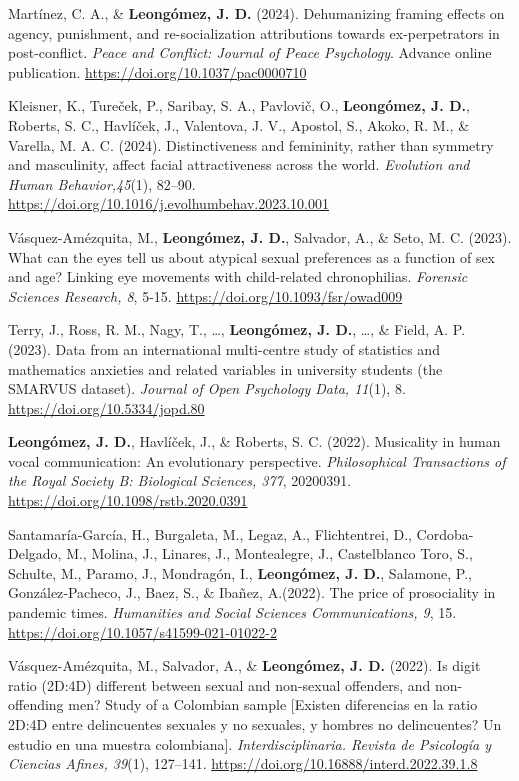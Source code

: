 \documentclass[11pt,a4paper,]{awesome-cv}
\begin{document}
Martínez, C. A., \& \textbf{Leongómez, J. D.} (2024). Dehumanizing
framing effects on agency, punishment, and re-socialization attributions
towards ex-perpetrators in post-conflict. \emph{Peace and Conflict:
Journal of Peace Psychology}. Advance online publication.
\url{https://doi.org/10.1037/pac0000710}

Kleisner, K., Tureček, P., Saribay, S. A., Pavlovič, O.,
\textbf{Leongómez, J. D.}, Roberts, S. C., Havlíček, J., Valentova, J.
V., Apostol, S., Akoko, R. M., \& Varella, M. A. C. (2024).
Distinctiveness and femininity, rather than symmetry and masculinity,
affect facial attractiveness across the world. \emph{Evolution and Human
Behavior,45}(1), 82--90.
\href{https://authors.elsevier.com/c/1hyfr3tz492kal}{https://doi.org/10.1016/j.evolhumbehav.2023.10.001}

Vásquez-Amézquita, M., \textbf{Leongómez, J. D.}, Salvador, A., \& Seto,
M. C. (2023). What can the eyes tell us about atypical sexual
preferences as a function of sex and age? Linking eye movements with
child-related chronophilias. \emph{Forensic Sciences Research, 8}, 5-15.
\url{https://doi.org/10.1093/fsr/owad009}

Terry, J., Ross, R. M., Nagy, T., \ldots, \textbf{Leongómez, J. D.},
\ldots, \& Field, A. P. (2023). Data from an international multi-centre
study of statistics and mathematics anxieties and related variables in
university students (the SMARVUS dataset). \emph{Journal of Open
Psychology Data, 11}(1), 8. \url{https://doi.org/10.5334/jopd.80}

\textbf{Leongómez, J. D.}, Havlíček, J., \& Roberts, S. C. (2022).
Musicality in human vocal communication: An evolutionary perspective.
\emph{Philosophical Transactions of the Royal Society B: Biological
Sciences, 377}, 20200391. \url{https://doi.org/10.1098/rstb.2020.0391}

Santamaría-García, H., Burgaleta, M., Legaz, A., Flichtentrei, D.,
Cordoba-Delgado, M., Molina, J., Linares, J., Montealegre, J.,
Castelblanco Toro, S., Schulte, M., Paramo, J., Mondragón, I.,
\textbf{Leongómez, J. D.}, Salamone, P., González‑Pacheco, J., Baez, S.,
\& Ibañez, A.(2022). The price of prosociality in pandemic times.
\emph{Humanities and Social Sciences Communications, 9}, 15.
\url{https://doi.org/10.1057/s41599-021-01022-2}

Vásquez-Amézquita, M., Salvador, A., \& \textbf{Leongómez, J. D.}
(2022). Is digit ratio (2D:4D) different between sexual and non-sexual
offenders, and non-offending men? Study of a Colombian sample {[}Existen
diferencias en la ratio 2D:4D entre delincuentes sexuales y no sexuales,
y hombres no delincuentes? Un estudio en una muestra colombiana{]}.
\emph{Interdisciplinaria. Revista de Psicología y Ciencias Afines,
39}(1), 127--141. \url{https://doi.org/10.16888/interd.2022.39.1.8}
\end{document}

